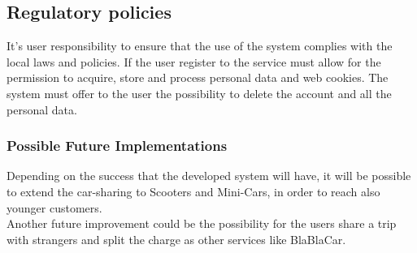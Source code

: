 \subsection{Regulatory policies}
It’s user responsibility to ensure that the use of the system complies with the local laws and policies. If the user register to the service must allow for the permission to acquire, store and process personal data and web cookies. The system must offer to the user the possibility to delete the account and all the personal data.


\subsubsection{Possible Future Implementations}
Depending on the success that the developed system will have, it will be possible to extend the car-sharing to Scooters and Mini-Cars, in order to reach also younger customers.
\noindent 
\\Another future improvement could be the possibility for the users share a trip with strangers and split the charge as other services like BlaBlaCar. 





